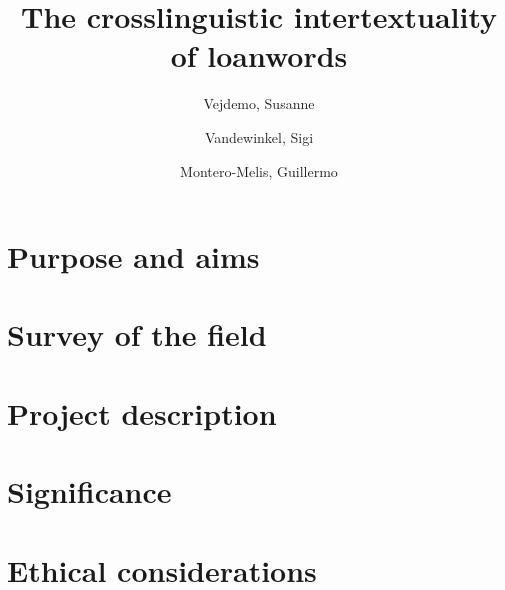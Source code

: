 \documentclass[a4paper]{article}
\title{The crosslinguistic intertextuality of loanwords}
\author{Vejdemo, Susanne \and Vandewinkel, Sigi \and Montero-Melis, Guillermo}
\begin{document}
\maketitle


\section{Purpose and aims}




\section{Survey of the field}





\section{Project description}




\section{Significance}




\section{Ethical considerations}
\end{document}
